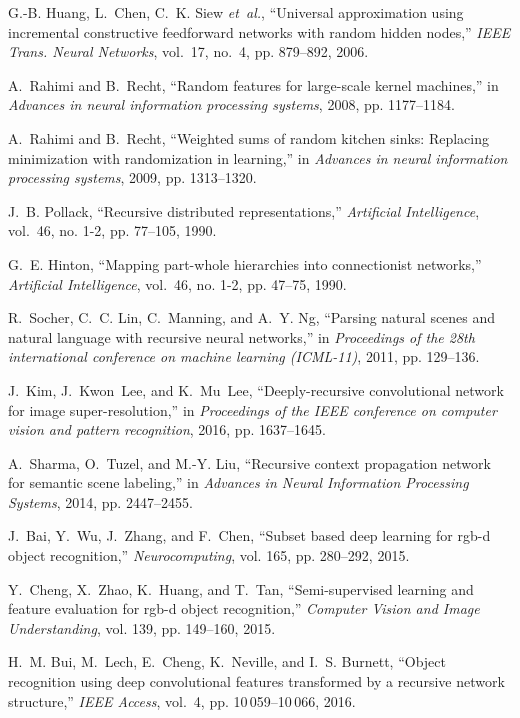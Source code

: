 \documentclass[10pt,journal,compsoc]{IEEEtran}
\begin{document}
\begin{thebibliography}{10}
G.-B. Huang, L.~Chen, C.~K. Siew \emph{et~al.}, ``Universal approximation using
  incremental constructive feedforward networks with random hidden nodes,''
  \emph{IEEE Trans. Neural Networks}, vol.~17, no.~4, pp. 879--892, 2006.

A.~Rahimi and B.~Recht, ``Random features for large-scale kernel machines,'' in
  \emph{Advances in neural information processing systems}, 2008, pp.
  1177--1184.

A.~Rahimi and B.~Recht, ``Weighted sums of random kitchen sinks: Replacing
  minimization with randomization in learning,'' in \emph{Advances in neural
  information processing systems}, 2009, pp. 1313--1320.

J.~B. Pollack, ``Recursive distributed representations,'' \emph{Artificial
  Intelligence}, vol.~46, no. 1-2, pp. 77--105, 1990.

G.~E. Hinton, ``Mapping part-whole hierarchies into connectionist networks,''
  \emph{Artificial Intelligence}, vol.~46, no. 1-2, pp. 47--75, 1990.

R.~Socher, C.~C. Lin, C.~Manning, and A.~Y. Ng, ``Parsing natural scenes and
  natural language with recursive neural networks,'' in \emph{Proceedings of
  the 28th international conference on machine learning (ICML-11)}, 2011, pp.
  129--136.

J.~Kim, J.~Kwon~Lee, and K.~Mu~Lee, ``Deeply-recursive convolutional network
  for image super-resolution,'' in \emph{Proceedings of the IEEE conference on
  computer vision and pattern recognition}, 2016, pp. 1637--1645.

A.~Sharma, O.~Tuzel, and M.-Y. Liu, ``Recursive context propagation network for
  semantic scene labeling,'' in \emph{Advances in Neural Information Processing
  Systems}, 2014, pp. 2447--2455.

J.~Bai, Y.~Wu, J.~Zhang, and F.~Chen, ``Subset based deep learning for rgb-d
  object recognition,'' \emph{Neurocomputing}, vol. 165, pp. 280--292, 2015.

Y.~Cheng, X.~Zhao, K.~Huang, and T.~Tan, ``Semi-supervised learning and feature
  evaluation for rgb-d object recognition,'' \emph{Computer Vision and Image
  Understanding}, vol. 139, pp. 149--160, 2015.

H.~M. Bui, M.~Lech, E.~Cheng, K.~Neville, and I.~S. Burnett, ``Object
  recognition using deep convolutional features transformed by a recursive
  network structure,'' \emph{IEEE Access}, vol.~4, pp. 10\,059--10\,066, 2016.


\end{thebibliography}
\end{document}
